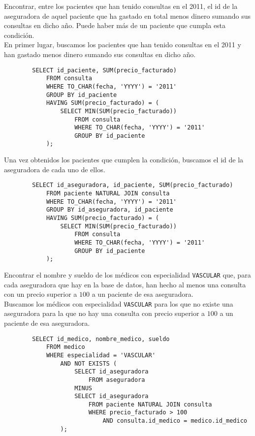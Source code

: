 \documentclass[12pt]{article}
\begin{document}
\begin{ejercicio}[SQL]
    Encontrar, entre los pacientes que han tenido consultas en el 2011, el id de la aseguradora de aquel paciente que ha gastado en total menos dinero sumando sus consultas en dicho año. Puede haber más de un paciente que cumpla esta condición.\\

    En primer lugar, buscamos los pacientes que han tenido consultas en el 2011 y han gastado menos dinero sumando sus consultas en dicho año.
    \begin{verbatim}
        SELECT id_paciente, SUM(precio_facturado)
            FROM consulta
            WHERE TO_CHAR(fecha, 'YYYY') = '2011'
            GROUP BY id_paciente
            HAVING SUM(precio_facturado) = (
                SELECT MIN(SUM(precio_facturado))
                    FROM consulta
                    WHERE TO_CHAR(fecha, 'YYYY') = '2011'
                    GROUP BY id_paciente
            );
    \end{verbatim}

    Una vez obtenidos los pacientes que cumplen la condición, buscamos el id de la aseguradora de cada uno de ellos.
    \begin{verbatim}
        SELECT id_aseguradora, id_paciente, SUM(precio_facturado)
            FROM paciente NATURAL JOIN consulta
            WHERE TO_CHAR(fecha, 'YYYY') = '2011'
            GROUP BY id_aseguradora, id_paciente
            HAVING SUM(precio_facturado) = (
                SELECT MIN(SUM(precio_facturado))
                    FROM consulta
                    WHERE TO_CHAR(fecha, 'YYYY') = '2011'
                    GROUP BY id_paciente
            );
    \end{verbatim}
\end{ejercicio}

\begin{ejercicio}[SQL]
    Encontrar el nombre y sueldo de los médicos con especialidad \verb|VASCULAR| que, para cada aseguradora que hay en la base de datos, han hecho al menos una consulta con un precio superior a $100$ a un paciente de esa aseguradora.\\

    Buscamos los médicos con especialidad \verb|VASCULAR| para los que no existe una aseguradora para la que no hay una consulta con precio superior a $100$ a un paciente de esa aseguradora.
    \begin{verbatim}
        SELECT id_medico, nombre_medico, sueldo
            FROM medico
            WHERE especialidad = 'VASCULAR'
                AND NOT EXISTS (
                    SELECT id_aseguradora
                        FROM aseguradora
                    MINUS
                    SELECT id_aseguradora
                        FROM paciente NATURAL JOIN consulta
                        WHERE precio_facturado > 100
                            AND consulta.id_medico = medico.id_medico
                );
    \end{verbatim}
\end{ejercicio}
\end{document}
